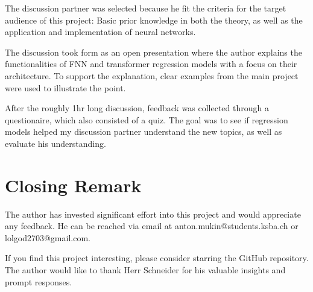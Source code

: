 \documentclass{article}
\begin{document}
The discussion partner was selected because he fit the criteria for the target audience of this project: Basic prior knowledge in both the theory, as well as the application and implementation of neural networks.

The discussion took form as an open presentation where the author explains the functionalities of FNN and transformer regression models with a focus on their architecture. To support the explanation, clear examples from the main project were used to illustrate the point.

After the roughly 1hr long discussion, feedback was collected through a questionaire, which also consisted of a quiz. The goal was to see if regression models helped my discussion partner understand the new topics, as well as evaluate his understanding.

\newpage
\section{Closing Remark}

The author has invested significant effort into this project and would appreciate any feedback. He can be reached via email at anton.mukin@students.ksba.ch or lolgod2703@gmail.com.

If you find this project interesting, please consider starring the GitHub repository.
\\[2em]
The author would like to thank Herr Schneider for his valuable insights and prompt responses.


\newpage
\printbibliography[heading=bibintoc]
\end{document}
